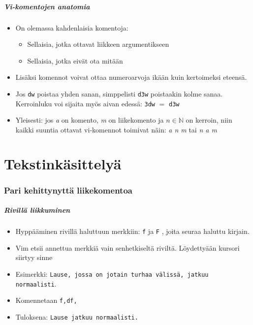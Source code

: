 \documentclass[]{beamer}
\newcommand{\Tohj}[1]{\texttt{#1}}
\newcommand{\com}[1]{{\color{blue!50!black}\Tohj{#1}} \!\!}
\begin{document}
\begin{frame}
    \frametitle{Vi-komentojen anatomia}
    \begin{itemize}
        \item On olemassa kahdenlaisia komentoja:
        \pause
        \begin{itemize}
            \item Sellaisia, jotka ottavat liikkeen argumentikseen
            \item Sellaisia, jotka eivät ota mitään
        \end{itemize}
        \pause
        \item Lisäksi komennot voivat ottaa numeroarvoja ikään kuin kertoimeksi eteensä.
        \pause
        \item Jos \com{dw} poistaa yhden sanan, simppelisti \com{d3w} poistaakin kolme sanaa. Kerroinluku voi sijaita myös aivan edessä: \com{3dw} $=$ \com{d3w}
        \pause
        \item Yleisesti: jos \emph{\color{red}a} on komento, \emph{\color{blue}m} on liikekomento ja {\color{purple}$n \in \mathbb{N}$} on kerroin, niin kaikki suuntia ottavat vi-komennot toimivat näin: \emph{{\color{red}a} {\color{purple}n} {\color{blue}m}} tai \emph{{\color{purple}n} {\color{red}a} {\color{blue}m}}
    \end{itemize}
\end{frame}

\part {Tekstinkäsittelyä}

\section {Pari kehittynyttä liikekomentoa}

\begin{frame}
    \frametitle {Rivillä liikkuminen}
    \begin{itemize}
        \item Hyppääminen rivillä haluttuun merkkiin: \com{f} ja \com{F}, joita seuraa haluttu kirjain.
        \item Vim etsii annettua merkkiä vain senhetkiseltä riviltä. Löydettyään kursori siirtyy sinne
        \pause
        \item Esimerkki: \texttt{{\color<2>{red}L}ause{\color<3-4>{red},} {\color<4>{red}jossa on jotain turhaa välissä,} jatkuu normaalisti}.
        \item Komennetaan \com{{\color<3>{red}f,}{\color<4>{red}df,}}
        \item<5> Tuloksena: \texttt{Lause jatkuu normaalisti.}
    \end{itemize}
\end{frame}
\end{document}
